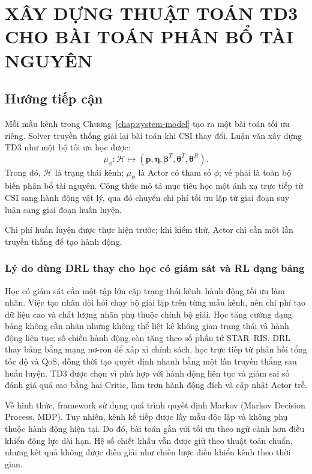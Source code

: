 \chapter{XÂY DỰNG THUẬT TOÁN TD3 CHO BÀI TOÁN PHÂN BỔ TÀI NGUYÊN}
\label{chap:method}

\section{Hướng tiếp cận}
Mỗi mẫu kênh trong Chương~\ref{chap:system-model} tạo ra một bài toán tối ưu riêng. Solver truyền thống giải lại bài toán khi CSI thay đổi. Luận văn xây dựng TD3 như một bộ tối ưu học được:
\begin{equation}
 \mu_{\phi}:\mathcal{H}\longmapsto
 (\bm p,\bm\eta,\bm\beta^T,\bm\theta^T,\bm\theta^R).
 \label{eq:learned-optimizer}
\end{equation}
Trong đó, $\mathcal H$ là trạng thái kênh; $\mu_{\phi}$ là Actor có tham số $\phi$; vế phải là toàn bộ biến phân bổ tài nguyên. Công thức mô tả mục tiêu học một ánh xạ trực tiếp từ CSI sang hành động vật lý, qua đó chuyển chi phí tối ưu lặp từ giai đoạn suy luận sang giai đoạn huấn luyện.

Chi phí huấn luyện được thực hiện trước; khi kiểm thử, Actor chỉ cần một lần truyền thẳng để tạo hành động.

\subsection{Lý do dùng DRL thay cho học có giám sát và RL dạng bảng}
Học có giám sát cần một tập lớn cặp trạng thái kênh--hành động tối ưu làm nhãn. Việc tạo nhãn đòi hỏi chạy bộ giải lặp trên từng mẫu kênh, nên chi phí tạo dữ liệu cao và chất lượng nhãn phụ thuộc chính bộ giải. Học tăng cường dạng bảng không cần nhãn nhưng không thể liệt kê không gian trạng thái và hành động liên tục; số chiều hành động còn tăng theo số phần tử STAR--RIS. DRL thay bảng bằng mạng nơ-ron để xấp xỉ chính sách, học trực tiếp từ phản hồi tổng tốc độ và QoS, đồng thời tạo quyết định nhanh bằng một lần truyền thẳng sau huấn luyện. TD3 được chọn vì phù hợp với hành động liên tục và giảm sai số đánh giá quá cao bằng hai Critic, làm trơn hành động đích và cập nhật Actor trễ.

Về hình thức, framework sử dụng quá trình quyết định Markov (Markov Decision Process, MDP). Tuy nhiên, kênh kế tiếp được lấy mẫu độc lập và không phụ thuộc hành động hiện tại. Do đó, bài toán gần với tối ưu theo ngữ cảnh hơn điều khiển động lực dài hạn. Hệ số chiết khấu vẫn được giữ theo thuật toán chuẩn, nhưng kết quả không được diễn giải như chiến lược điều khiển kênh theo thời gian.

